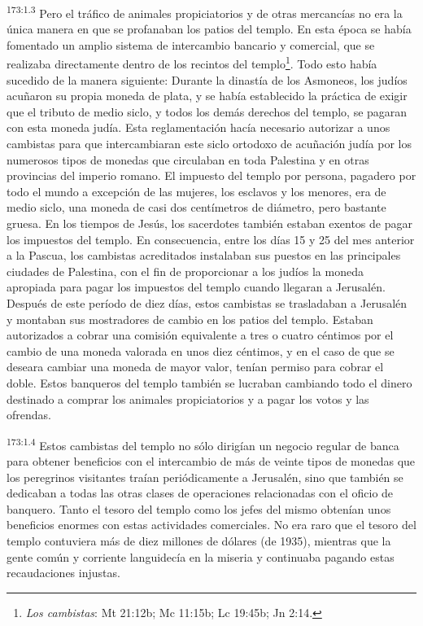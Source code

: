 \par 
\textsuperscript{173:1.3} Pero el tráfico de animales propiciatorios y de otras mercancías no era la única manera en que se profanaban los patios del templo. En esta época se había fomentado un amplio sistema de intercambio bancario y comercial, que se realizaba directamente dentro de los recintos del templo\footnote{\textit{Los cambistas}: Mt 21:12b; Mc 11:15b; Lc 19:45b; Jn 2:14.}. Todo esto había sucedido de la manera siguiente: Durante la dinastía de los Asmoneos, los judíos acuñaron su propia moneda de plata, y se había establecido la práctica de exigir que el tributo de medio siclo, y todos los demás derechos del templo, se pagaran con esta moneda judía. Esta reglamentación hacía necesario autorizar a unos cambistas para que intercambiaran este siclo ortodoxo de acuñación judía por los numerosos tipos de monedas que circulaban en toda Palestina y en otras provincias del imperio romano. El impuesto del templo por persona, pagadero por todo el mundo a excepción de las mujeres, los esclavos y los menores, era de medio siclo, una moneda de casi dos centímetros de diámetro, pero bastante gruesa. En los tiempos de Jesús, los sacerdotes también estaban exentos de pagar los impuestos del templo. En consecuencia, entre los días 15 y 25 del mes anterior a la Pascua, los cambistas acreditados instalaban sus puestos en las principales ciudades de Palestina, con el fin de proporcionar a los judíos la moneda apropiada para pagar los impuestos del templo cuando llegaran a Jerusalén. Después de este período de diez días, estos cambistas se trasladaban a Jerusalén y montaban sus mostradores de cambio en los patios del templo. Estaban autorizados a cobrar una comisión equivalente a tres o cuatro céntimos por el cambio de una moneda valorada en unos diez céntimos, y en el caso de que se deseara cambiar una moneda de mayor valor, tenían permiso para cobrar el doble. Estos banqueros del templo también se lucraban cambiando todo el dinero destinado a comprar los animales propiciatorios y a pagar los votos y las ofrendas.

\par 
\textsuperscript{173:1.4} Estos cambistas del templo no sólo dirigían un negocio regular de banca para obtener beneficios con el intercambio de más de veinte tipos de monedas que los peregrinos visitantes traían periódicamente a Jerusalén, sino que también se dedicaban a todas las otras clases de operaciones relacionadas con el oficio de banquero. Tanto el tesoro del templo como los jefes del mismo obtenían unos beneficios enormes con estas actividades comerciales. No era raro que el tesoro del templo contuviera más de diez millones de dólares (de 1935), mientras que la gente común y corriente languidecía en la miseria y continuaba pagando estas recaudaciones injustas.

